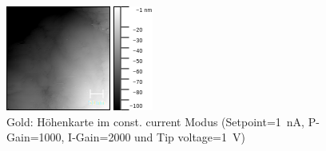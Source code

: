 \documentclass[sn-mathphys-num,iicol]{sn-jnl}
\theoremstyle{thmstyleone}
\theoremstyle{thmstyletwo}
\theoremstyle{thmstylethree}
\begin{document}
\begin{figure}[h]
        \centering
        \includegraphics[width=.5\textwidth]{../data/Gold_400nm_z.png}
        \caption{Gold: Höhenkarte im const. current Modus (Setpoint=\SI{1}{\nano A}, P-Gain=\SI{1000}{}, I-Gain=\SI{2000}{} und Tip voltage=\SI{1}{V})} \label{fig:g400nmz}
\end{figure}

\clearpage
\end{document}
